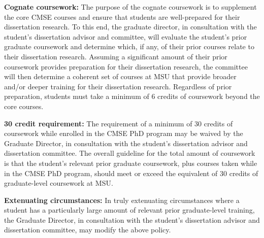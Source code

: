 \vspace{2mm}
\noindent
\textbf{Cognate coursework:} The purpose of the cognate coursework is
to supplement the core CMSE courses and ensure that students are
well-prepared for their dissertation research.  To this end, the
graduate director, in consultation with the student’s dissertation
advisor and committee, will evaluate the student’s prior graduate
coursework and determine which, if any, of their prior courses relate
to their dissertation research.  Assuming a significant amount of
their prior coursework provides preparation for their dissertation
research, the committee will then determine a coherent set of courses
at MSU that provide broader and/or deeper training for their
dissertation research.  Regardless of prior preparation, students must
take a minimum of 6 credits of coursework beyond the core courses.

\vspace{2mm}
\noindent
\textbf{30 credit requirement:} The requirement of a minimum of 30
credits of coursework while enrolled in the CMSE PhD program may be
waived by the Graduate Director, in consultation with the student’s
dissertation advisor and dissertation committee.  The overall
guideline for the total amount of coursework is that the student’s
relevant prior graduate coursework, plus courses taken while in the
CMSE PhD program, should meet or exceed the equivalent of 30 credits
of graduate-level coursework at MSU.

\vspace{2mm}
\noindent
\textbf{Extenuating circumstances:} In truly extenuating circumstances
where a student has a particularly large amount of relevant prior
graduate-level training, the Graduate Director, in consultation with
the student’s dissertation advisor and dissertation committee, may
modify the above policy.


